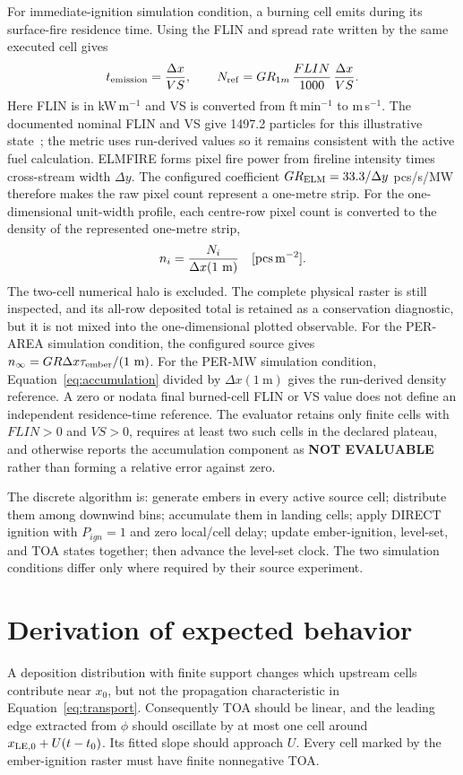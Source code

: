 For immediate-ignition simulation condition, a burning cell emits during its surface-fire residence time. Using
the FLIN and spread rate written by the same executed cell gives
\begin{equation}
 t_{\rm emission}=\frac{\Delta x}{VS},\qquad
 N_{\rm ref}=GR_{1m}\,\frac{FLIN}{1000}\,\frac{\Delta x}{VS}.
 \label{eq:accumulation}
\end{equation}
Here FLIN is in kW\,m$^{-1}$ and VS is converted from ft\,min$^{-1}$ to
m\,s$^{-1}$. The documented nominal FLIN and VS give 1497.2 particles
for this illustrative state~\cite{Qin2025}; the metric uses run-derived values
so it remains consistent with the active fuel calculation.
ELMFIRE forms pixel fire power from fireline intensity times cross-stream width
$\Delta y$. The configured coefficient $GR_{\rm ELM}=33.3/\Delta y$
pcs/s/MW therefore makes the raw pixel count represent a one-metre strip.
For the one-dimensional unit-width profile, each centre-row pixel count is
converted to the density of the represented one-metre strip,
\begin{equation}
n_i=\frac{N_i}{\Delta x(1\ {\rm m})}\quad[\mathrm{pcs\,m^{-2}}].
\label{eq:density}
\end{equation}
The two-cell numerical halo is excluded. The complete physical raster is still
inspected, and its all-row deposited total is retained as a conservation
diagnostic, but it is not mixed into the one-dimensional plotted observable.
For the PER-AREA simulation condition, the configured source gives
$n_\infty=GR\Delta x\tau_{\rm ember}/(1~\mathrm{m})$. For the PER-MW
simulation condition, Equation~\ref{eq:accumulation} divided by
$\Delta x(1~\mathrm{m})$ gives the run-derived density reference. A zero or
nodata final burned-cell FLIN or VS value does not define an independent
residence-time reference. The evaluator retains only finite cells with
$FLIN>0$ and $VS>0$, requires at least two such cells in the declared plateau,
and otherwise reports the accumulation component as \textbf{NOT EVALUABLE}
rather than forming a relative error against zero.

The discrete algorithm is: generate embers in every active source cell; distribute
them among downwind bins; accumulate them in landing cells; apply DIRECT ignition
with $P_{ign}=1$ and zero local/cell delay; update ember-ignition, level-set, and
TOA states together; then advance the level-set clock. The two simulation conditions differ
only where required by their source experiment.

\section{Derivation of expected behavior}
A deposition distribution with finite support changes which upstream cells
contribute near $x_0$, but not the propagation characteristic in
Equation~\ref{eq:transport}. Consequently TOA should be linear, and the leading
edge extracted from $\phi$ should oscillate by at most one cell around
$x_{\rm LE,0}+U(t-t_0)$. Its fitted slope should approach $U$. Every cell marked by the
ember-ignition raster must have finite nonnegative TOA.

